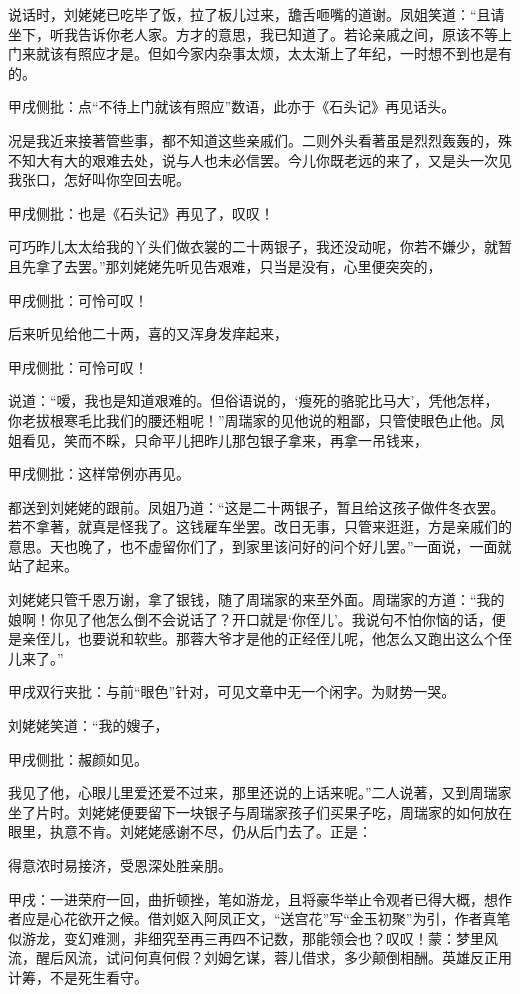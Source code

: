 \begin{parag}

    说话时，刘姥姥已吃毕了饭，拉了板儿过来，舚舌咂嘴的道谢。凤姐笑道：“且请坐下，听我告诉你老人家。方才的意思，我已知道了。若论亲戚之间，原该不等上门来就该有照应才是。但如今家内杂事太烦，太太渐上了年纪，一时想不到也是有的。\begin{note}甲戌侧批：点“不待上门就该有照应”数语，此亦于《石头记》再见话头。\end{note}况是我近来接著管些事，都不知道这些亲戚们。二则外头看著虽是烈烈轰轰的，殊不知大有大的艰难去处，说与人也未必信罢。今儿你既老远的来了，又是头一次见我张口，怎好叫你空回去呢。\begin{note}甲戌侧批：也是《石头记》再见了，叹叹！\end{note}可巧昨儿太太给我的丫头们做衣裳的二十两银子，我还没动呢，你若不嫌少，就暂且先拿了去罢。”那刘姥姥先听见告艰难，只当是没有，心里便突突的，\begin{note}甲戌侧批：可怜可叹！\end{note}后来听见给他二十两，喜的又浑身发痒起来，\begin{note}甲戌侧批：可怜可叹！\end{note}说道：“嗳，我也是知道艰难的。但俗语说的，‘瘦死的骆驼比马大’，凭他怎样，你老拔根寒毛比我们的腰还粗呢！”周瑞家的见他说的粗鄙，只管使眼色止他。凤姐看见，笑而不睬，只命平儿把昨儿那包银子拿来，再拿一吊钱来，\begin{note}甲戌侧批：这样常例亦再见。\end{note}都送到刘姥姥的跟前。凤姐乃道：“这是二十两银子，暂且给这孩子做件冬衣罢。若不拿著，就真是怪我了。这钱雇车坐罢。改日无事，只管来逛逛，方是亲戚们的意思。天也晚了，也不虚留你们了，到家里该问好的问个好儿罢。”一面说，一面就站了起来。
\end{parag}


\begin{parag}

    刘姥姥只管千恩万谢，拿了银钱，随了周瑞家的来至外面。周瑞家的方道：“我的娘啊！你见了他怎么倒不会说话了？开口就是‘你侄儿’。我说句不怕你恼的话，便是亲侄儿，也要说和软些。那蓉大爷才是他的正经侄儿呢，他怎么又跑出这么个侄儿来了。”\begin{note}甲戌双行夹批：与前“眼色”针对，可见文章中无一个闲字。为财势一哭。\end{note}刘姥姥笑道：“我的嫂子，\begin{note}甲戌侧批：赧颜如见。\end{note}我见了他，心眼儿里爱还爱不过来，那里还说的上话来呢。”二人说著，又到周瑞家坐了片时。刘姥姥便要留下一块银子与周瑞家孩子们买果子吃，周瑞家的如何放在眼里，执意不肯。刘姥姥感谢不尽，仍从后门去了。正是：
\end{parag}

\begin{poem}
    \begin{pl}
        得意浓时易接济，受恩深处胜亲朋。
    \end{pl}
\end{poem}
\begin{parag}
    \begin{note}甲戌：一进荣府一回，曲折顿挫，笔如游龙，且将豪华举止令观者已得大概，想作者应是心花欲开之候。借刘妪入阿凤正文，“送宫花”写“金玉初聚”为引，作者真笔似游龙，变幻难测，非细究至再三再四不记数，那能领会也？叹叹！蒙：梦里风流，醒后风流，试问何真何假？刘姆乞谋，蓉儿借求，多少颠倒相酬。英雄反正用计筹，不是死生看守。\end{note}
\end{parag}
